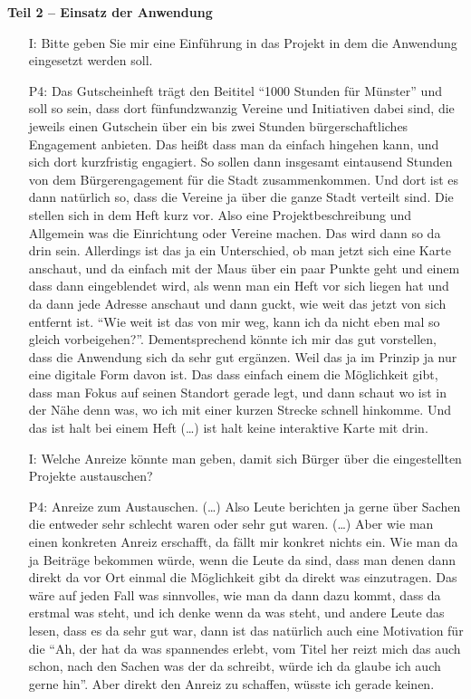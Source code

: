 \textbf{Teil 2 -- Einsatz der Anwendung}
\begin{itemize}
    \item[I:] Bitte geben Sie mir eine Einf{\"u}hrung in das Projekt in dem die Anwendung eingesetzt werden soll.
    \item[P4:] Das Gutscheinheft tr{\"a}gt den Beititel "`1000 Stunden f{\"u}r M{\"u}nster"' und soll so sein, dass dort f{\"u}nfundzwanzig Vereine und Initiativen dabei sind, die jeweils einen Gutschein {\"u}ber ein bis zwei Stunden b{\"u}rgerschaftliches Engagement anbieten. Das hei{\ss}t dass man da einfach hingehen kann, und sich dort kurzfristig engagiert. So sollen dann insgesamt eintausend Stunden von dem B{\"u}rgerengagement f{\"u}r die Stadt zusammenkommen. Und dort ist es dann nat{\"u}rlich so, dass die Vereine ja {\"u}ber die ganze Stadt verteilt sind. Die stellen sich in dem Heft kurz vor. Also eine Projektbeschreibung und Allgemein was die Einrichtung oder Vereine machen. Das wird dann so da drin sein. Allerdings ist das ja ein Unterschied, ob man jetzt sich eine Karte anschaut, und da einfach mit der Maus {\"u}ber ein paar Punkte geht und einem dass dann eingeblendet wird, als wenn man ein Heft vor sich liegen hat und da dann jede Adresse anschaut und dann guckt, wie weit das jetzt von sich entfernt ist. "`Wie weit ist das von mir weg, kann ich da nicht eben mal so gleich vorbeigehen?"'. Dementsprechend k{\"o}nnte ich mir das gut vorstellen, dass die Anwendung sich da sehr gut erg{\"a}nzen. Weil das ja im Prinzip ja nur eine digitale Form davon ist. Das dass einfach einem die M{\"o}glichkeit gibt, dass man Fokus auf seinen Standort gerade legt, und dann schaut wo ist in der N{\"a}he denn was, wo ich mit einer kurzen Strecke schnell hinkomme. Und das ist halt bei einem Heft (\dots) ist halt keine interaktive Karte mit drin.
    \item[I:] Welche Anreize k{\"o}nnte man geben, damit sich B{\"u}rger {\"u}ber die eingestellten Projekte austauschen?
    \item[P4:] Anreize zum Austauschen. (\dots) Also Leute berichten ja gerne {\"u}ber Sachen die entweder sehr schlecht waren oder sehr gut waren. (\dots) Aber wie man einen konkreten Anreiz erschafft, da f{\"a}llt mir konkret nichts ein. Wie man da ja Beitr{\"a}ge bekommen w{\"u}rde, wenn die Leute da sind, dass man denen dann direkt da vor Ort einmal die M{\"o}glichkeit gibt da direkt was einzutragen. Das w{\"a}re auf jeden Fall was sinnvolles, wie man da dann dazu kommt, dass da erstmal was steht, und ich denke wenn da was steht, und andere Leute das lesen, dass es da sehr gut war, dann ist das nat{\"u}rlich auch eine Motivation f{\"u}r die "`Ah, der hat da was spannendes erlebt, vom Titel her reizt mich das auch schon, nach den Sachen was der da schreibt, w{\"u}rde ich da glaube ich auch gerne hin"'. Aber direkt den Anreiz zu schaffen, w{\"u}sste ich gerade keinen.

\end{itemize}
